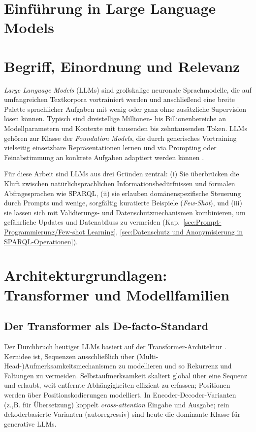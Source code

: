 \section{Einführung in Large Language Models}
\label{Einfuehrung in Large-Language-Models}

\section{Begriff, Einordnung und Relevanz}
\label{sec:LLM-Begriff}

\emph{Large Language Models} (LLMs) sind großskalige neuronale Sprachmodelle, die auf umfangreichen Textkorpora vortrainiert werden und anschließend eine breite Palette sprachlicher Aufgaben mit wenig oder ganz ohne zusätzliche Supervision lösen können. Typisch sind dreistellige Millionen- bis Billionenbereiche an Modellparametern und Kontexte mit tausenden bis zehntausenden Token. LLMs gehören zur Klasse der \emph{Foundation Models}, die durch generisches Vortraining vielseitig einsetzbare Repräsentationen lernen und via Prompting oder Feinabstimmung an konkrete Aufgaben adaptiert werden können \cite{brown2020language,openai2023gpt4}.

Für diese Arbeit sind LLMs aus drei Gründen zentral: (i) Sie überbrücken die Kluft zwischen natürlichsprachlichen Informationsbedürfnissen und formalen Abfragesprachen wie SPARQL, (ii) sie erlauben domänenspezifische Steuerung durch Prompts und wenige, sorgfältig kuratierte Beispiele (\emph{Few-Shot}), und (iii) sie lassen sich mit Validierungs- und Datenschutzmechanismen kombinieren, um gefährliche Updates und Datenabfluss zu vermeiden (Kap.~\ref{sec:Prompt-Programmierung/Few-shot Learning}, \ref{sec:Datenschutz und Anonymisierung in SPARQL-Operationen}).

\section{Architekturgrundlagen: Transformer und Modellfamilien}
\label{sec:Transformer-und-Familien}

\subsection{Der Transformer als De-facto-Standard}
Der Durchbruch heutiger LLMs basiert auf der Transformer-Architektur \cite{vaswani2017attention}. Kernidee ist, Sequenzen ausschließlich über (Multi-Head-)Aufmerksamkeitsmechanismen zu modellieren und so Rekurrenz und Faltungen zu vermeiden. Selbstaufmerksamkeit skaliert global über eine Sequenz und erlaubt, weit entfernte Abhängigkeiten effizient zu erfassen; Positionen werden über Positionskodierungen modelliert. In Encoder-Decoder-Varianten (z.,B. für Übersetzung) koppelt \emph{cross-attention} Eingabe und Ausgabe; rein dekoderbasierte Varianten (autoregressiv) sind heute die dominante Klasse für generative LLMs.

